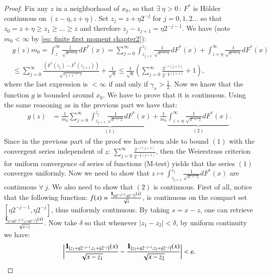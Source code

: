 \begin{proof}
Fix any $z$ in a neighborhood of $x_0$, so that $ \exists \: \eta >0 \, : \, F^*$ is Hölder continuous on $(z- \eta, z+ \eta)$. Set $z_j = z + \eta 2^{-j}$ for $j=0,1,2...$ so that $z_0 = z+\eta \geq z_1 \geq ... \geq z$ and therefore $z_j - z_{j+1} = \eta 2^{-j-1}$. We have (note $m_0 < \infty$ by \eqref{eq: finite first moment chapter2}):
\begin{align*}
    &g (z)m_0 = \int_{z}^{\infty} \frac{1}{\sqrt{x-z}} dF^*(x) = \sum_{j=0}^{\infty} \int_{z_{j+1}}^{z_j} \frac{1}{\sqrt{x-z}} dF^*(x) + \int_{z+\eta}^{\infty} \frac{1}{\sqrt{x-z}} dF^*(x)  \\
    &\leq\sum_{j=0}^{\infty} \frac{(F^*(z_j)-F^*(z_{j+1}))}{\sqrt{z_{j+1}-z}}  + \frac{1}{\sqrt{\eta}} \leq \frac{1}{\sqrt{\eta}} \left( \sum_{j=0}^{\infty} \frac{2^{-\gamma(j+1)}}{2^{-\frac{1}{2}(j+1)}} + 1 \right), 
\end{align*}
where the last expression is $< \infty $ if and only if $\gamma_x> \frac{1}{2}$. Now we know that the function $g$ is bounded around $x_0$. We have to prove that it is continuous. Using the same reasoning as in the previous part we have that:
\begin{align*}
     g (z) & =\frac{1}{m_0} \underbrace{\sum_{j=0}^{\infty} \int_{z_{j+1}}^{z_j} \frac{1}{\sqrt{x-z}} dF^*(x)}_{(1)} + \frac{1}{m_0} \underbrace{\int_{z+\eta}^{\infty} \frac{1}{\sqrt{x-z}} dF^*(x)}_{(2)}.
\end{align*}
Since in the previous part of the proof we have been able to bound $(1)$ with the convergent series independent of $z$: $\sum_{j=0}^{\infty} \frac{2^{-\gamma(j+1)}}{2^{-\frac{1}{2}(j+1)}}$, then the Weierstrass criterion for uniform convergence of series of functions (M-test) yields that the series $(1)$ converges uniformly. Now we need to show that $z \mapsto \int_{z_{j+1}}^{z_j} \frac{1}{\sqrt{x-z}} dF^*(x)$ are continuous $\forall \: j$. We also need to show that $(2)$ is continuous. First of all, notice that the following function: $f(s) = \frac{\mathbf{1}_{[\eta 2^{-j-1}, \eta 2^{-j}]}(s)}{\sqrt{s}}$, is continuous on the compact set $[\eta 2^{-j-1},\eta 2^{-j}]$, thus uniformly continuous.
By taking $s=x-z$, one can retrieve $\frac{\mathbf{1}_{[z+ \eta 2^{-j-1}, z + \eta 2^{-j}]} (x)}{\sqrt{x-z}}$. Now take $\delta$ so that whenever $|z_1 - z_2| < \delta$, by uniform continuity we have:
\begin{align*}
    \bigg| \frac{\ind_{[z_1 + \eta 2^{-j-1}, z_1 + \eta 2^{-j}]} (x)}{\sqrt{x-z_1}} - \frac{\ind_{[z_2 +\eta 2^{-j-1}, z_2 +\eta 2^{-j}]} (x)}{\sqrt{x-z_2}} \bigg| < \varepsilon.

\end{align*}
\end{proof}
